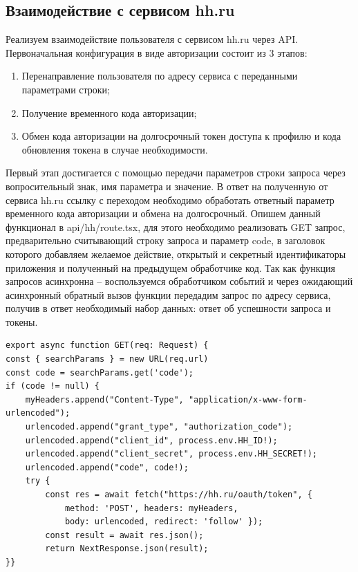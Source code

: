 \documentclass[master, och, diploma]{SCWorks}
\begin{document}
\subsection{Взаимодействие с сервисом hh.ru}
Реализуем взаимодействие пользователя с сервисом hh.ru через API. Первоначальная конфигурация в виде авторизации состоит из 3 этапов:
\begin{enumerate}
    \item Перенаправление пользователя по адресу сервиса с переданными параметрами строки;
    \item Получение временного кода авторизации;
    \item Обмен кода авторизации на долгосрочный токен доступа к профилю и кода обновления токена в случае необходимости.\cite{hh_api}
\end{enumerate}

Первый этап достигается с помощью передачи параметров строки запроса через вопросительный знак, имя параметра и значение. В ответ на полученную от сервиса hh.ru ссылку с переходом необходимо обработать ответный параметр временного кода авторизации и обмена на долгосрочный. Опишем данный функционал в api/hh/route.tsx, для этого необходимо реализовать GET запрос, предварительно считывающий строку запроса и параметр code, в заголовок которого добавляем желаемое действие, открытый и секретный идентификаторы приложения и полученный на предыдущем обработчике код. Так как функция запросов асинхронна – воспользуемся обработчиком событий и через ожидающий асинхронный обратный вызов функции передадим запрос по адресу сервиса, получив в ответ необходимый набор данных: ответ об успешности запроса и токены\cite{Razin_2020}.
\begin{verbatim}
export async function GET(req: Request) {
const { searchParams } = new URL(req.url)
const code = searchParams.get('code');
if (code != null) {
    myHeaders.append("Content-Type", "application/x-www-form-urlencoded");
    urlencoded.append("grant_type", "authorization_code");
    urlencoded.append("client_id", process.env.HH_ID!);
    urlencoded.append("client_secret", process.env.HH_SECRET!);
    urlencoded.append("code", code!);
    try {
        const res = await fetch("https://hh.ru/oauth/token", {
            method: 'POST', headers: myHeaders,
            body: urlencoded, redirect: 'follow' });   
        const result = await res.json();
        return NextResponse.json(result);
}} 
\end{verbatim}
\end{document}
